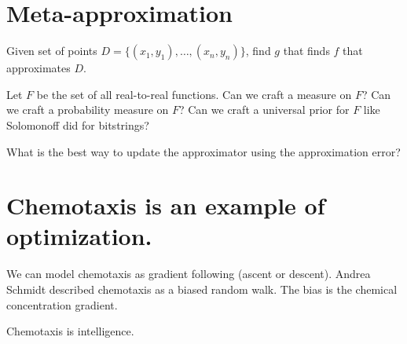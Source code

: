 \section{Meta-approximation}

Given set of points
\(D = \{(x_1,y_1),\ldots,(x_n,y_n)\}\),
find \(g\) that finds \(f\) that approximates \(D\).

Let \(F\) be the set of all real-to-real functions.
Can we craft a measure on \(F\)?
Can we craft a probability measure on \(F\)?
Can we craft a universal prior for \(F\) like Solomonoff did for bitstrings?

What is the best way to update the approximator using the approximation error?

\section{Chemotaxis is an example of optimization.}

We can model chemotaxis as gradient following (ascent or descent).
Andrea Schmidt described chemotaxis as a biased random walk.
The bias is the chemical concentration gradient.

Chemotaxis is intelligence.
